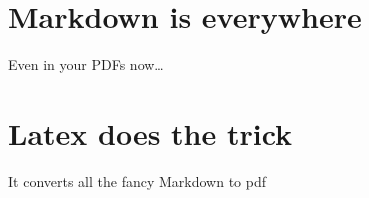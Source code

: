 \chapter{Markdown is everywhere}\label{markdown-is-everywhere}

Even in your PDFs now\ldots{}

\chapter{Latex does the trick}\label{latex-does-the-trick}

It converts all the fancy Markdown to pdf
